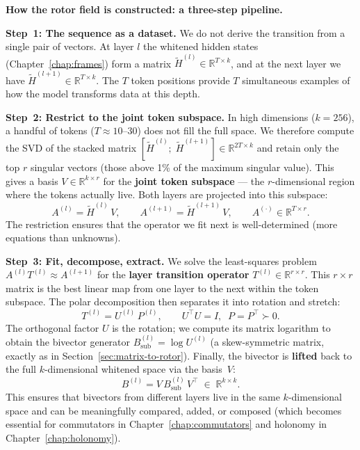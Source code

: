 \documentclass[11pt, twoside, openright]{memoir}
\numberwithin{equation}{chapter}
\begin{document}
\begin{mathbox}
\textbf{How the rotor field is constructed: a three-step pipeline.}

\textbf{Step~1: The sequence as a dataset.}
We do not derive the transition from a single pair of vectors.
At layer $l$ the whitened hidden states
(Chapter~\ref{chap:frames}) form a matrix
$\tilde{H}^{(l)} \in \mathbb{R}^{T \times k}$, and at the next layer
we have $\tilde{H}^{(l+1)} \in \mathbb{R}^{T \times k}$.  The $T$
token positions provide $T$ simultaneous examples of how the model
transforms data at this depth.

\textbf{Step~2: Restrict to the joint token subspace.}
In high dimensions ($k = 256$), a handful of tokens ($T \approx 10$--$30$)
does not fill the full space.  We therefore compute the SVD of the
stacked matrix $[\tilde{H}^{(l)};\; \tilde{H}^{(l+1)}] \in
\mathbb{R}^{2T \times k}$ and retain only the top $r$ singular vectors
(those above 1\% of the maximum singular value).  This gives a basis
$V \in \mathbb{R}^{k \times r}$ for the \textbf{joint token subspace}
--- the $r$-dimensional region where the tokens actually live.  Both
layers are projected into this subspace:
\begin{equation}
  A^{(l)} = \tilde{H}^{(l)}\, V, \qquad
  A^{(l+1)} = \tilde{H}^{(l+1)}\, V,
  \qquad A^{(\cdot)} \in \mathbb{R}^{T \times r}.
\end{equation}
The restriction ensures that the operator we fit next is well-determined
(more equations than unknowns).

\textbf{Step~3: Fit, decompose, extract.}
We solve the least-squares problem
$A^{(l)} T^{(l)} \approx A^{(l+1)}$
for the \textbf{layer transition operator} $T^{(l)} \in \mathbb{R}^{r \times r}$.
This $r \times r$ matrix is the best linear map from one layer to the next
within the token subspace.  The polar decomposition then separates it
into rotation and stretch:
\begin{equation}
\label{eq:polar}
  T^{(l)} = U^{(l)}\, P^{(l)},
  \qquad U^\top U = I,\;\; P = P^\top \succ 0.
\end{equation}
The orthogonal factor $U$ is the rotation; we compute its matrix
logarithm to obtain the bivector generator
$B^{(l)}_{\text{sub}} = \log U^{(l)}$ (a skew-symmetric matrix, exactly
as in Section~\ref{sec:matrix-to-rotor}).  Finally, the bivector is
\textbf{lifted} back to the full $k$-dimensional whitened space via the
basis~$V$:
\begin{equation}
  B^{(l)} = V\, B^{(l)}_{\text{sub}}\, V^\top
  \;\in\; \mathbb{R}^{k \times k}.
\end{equation}
This ensures that bivectors from different layers live in the same
$k$-dimensional space and can be meaningfully compared, added, or
composed (which becomes essential for commutators in
Chapter~\ref{chap:commutators} and holonomy in
Chapter~\ref{chap:holonomy}).


\end{mathbox}
\end{document}

